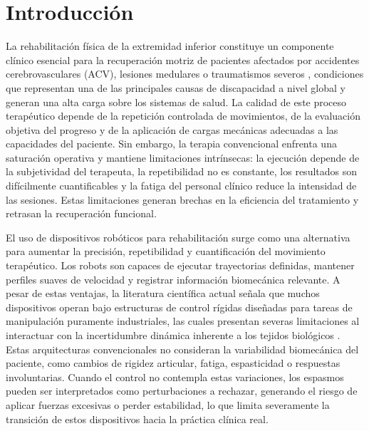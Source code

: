 \documentclass[a4paper,12pt]{article}
\begin{document}
\newpage
\tableofcontents
\newpage
\listoffigures
\newpage
\section{Introducción}



La rehabilitación física de la extremidad inferior constituye un componente clínico esencial para la recuperación motriz de pacientes afectados por accidentes cerebrovasculares (ACV), lesiones medulares o traumatismos severos \citep{who2024neurological}, condiciones que representan una de las principales causas de discapacidad a nivel global y generan una alta carga sobre los sistemas de salud. La calidad de este proceso terapéutico depende de la repetición controlada de movimientos, de la evaluación objetiva del progreso y de la aplicación de cargas mecánicas adecuadas a las capacidades del paciente. Sin embargo, la terapia convencional enfrenta una saturación operativa y mantiene limitaciones intrínsecas: la ejecución depende de la subjetividad del terapeuta, la repetibilidad no es constante, los resultados son difícilmente cuantificables y la fatiga del personal clínico reduce la intensidad de las sesiones. Estas limitaciones generan brechas en la eficiencia del tratamiento y retrasan la recuperación funcional.

El uso de dispositivos robóticos para rehabilitación surge como una alternativa para aumentar la precisión, repetibilidad y cuantificación del movimiento terapéutico. Los robots son capaces de ejecutar trayectorias definidas, mantener perfiles suaves de velocidad y registrar información biomecánica relevante. A pesar de estas ventajas, la literatura científica actual señala que muchos dispositivos operan bajo estructuras de control rígidas diseñadas para tareas de manipulación puramente industriales, las cuales presentan severas limitaciones al interactuar con la incertidumbre dinámica inherente a los tejidos biológicos \citep{banyai2024robotics}. Estas arquitecturas convencionales no consideran la variabilidad biomecánica del paciente, como cambios de rigidez articular, fatiga, espasticidad o respuestas involuntarias. Cuando el control no contempla estas variaciones, los espasmos pueden ser interpretados como perturbaciones a rechazar, generando el riesgo de aplicar fuerzas excesivas o perder estabilidad, lo que limita severamente la transición de estos dispositivos hacia la práctica clínica real.
\end{document}
